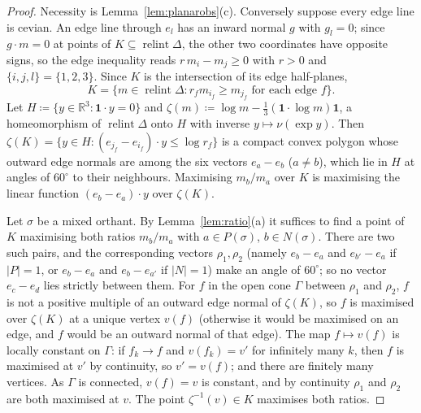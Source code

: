 \documentclass[11pt]{article}
\newcommand{\R}{\mathbb{R}}
\newcommand{\one}{\mathbf{1}}
\DeclareMathOperator{\relint}{relint}
\theoremstyle{plain}
\theoremstyle{definition}
\theoremstyle{remark}
\begin{document}
\begin{proof}
Necessity is Lemma~\ref{lem:planarobs}(c). Conversely suppose every edge line is cevian.
An edge line through $e_l$ has an inward normal $g$ with $g_l=0$; since $g\cdot m=0$ at
points of $K\subseteq\relint\Delta$, the other two coordinates have opposite signs, so the
edge inequality reads $r\,m_i-m_j\ge0$ with $r>0$ and $\{i,j,l\}=\{1,2,3\}$. Since $K$ is
the intersection of its edge half-planes,
\[
  K=\{m\in\relint\Delta:r_fm_{i_f}\ge m_{j_f}\text{ for each edge }f\}.
\]
Let $H\coloneqq\{y\in\R^3:\one\cdot y=0\}$ and $\zeta(m)\coloneqq\log m-\frac13(\one\cdot
\log m)\one$, a homeomorphism of $\relint\Delta$ onto $H$ with inverse $y\mapsto\nu(\exp
y)$. Then $\zeta(K)=\{y\in H:(e_{j_f}-e_{i_f})\cdot y\le\log r_f\}$ is a compact convex
polygon whose outward edge normals are among the six vectors $e_a-e_b$ ($a\ne b$), which
lie in $H$ at angles of $60^\circ$ to their neighbours. Maximising $m_b/m_a$ over $K$ is
maximising the linear function $(e_b-e_a)\cdot y$ over $\zeta(K)$.

Let $\sigma$ be a mixed orthant. By Lemma~\ref{lem:ratio}(a) it suffices to find a point of
$K$ maximising both ratios $m_b/m_a$ with $a\in P(\sigma)$, $b\in N(\sigma)$. There are two
such pairs, and the corresponding vectors $\rho_1,\rho_2$ (namely $e_b-e_a$ and
$e_{b'}-e_a$ if $|P|=1$, or $e_b-e_a$ and $e_b-e_{a'}$ if $|N|=1$) make an angle of
$60^\circ$; so no vector $e_c-e_d$ lies strictly between them. For $f$ in the open cone
$\Gamma$ between $\rho_1$ and $\rho_2$, $f$ is not a positive multiple of an outward edge
normal of $\zeta(K)$, so $f$ is maximised over $\zeta(K)$ at a unique vertex $v(f)$
(otherwise it would be maximised on an edge, and $f$ would be an outward normal of that
edge). The map $f\mapsto v(f)$ is locally constant on $\Gamma$: if $f_k\to f$ and
$v(f_k)=v'$ for infinitely many $k$, then $f$ is maximised at $v'$ by continuity, so
$v'=v(f)$; and there are finitely many vertices. As $\Gamma$ is connected, $v(f)=v$ is
constant, and by continuity $\rho_1$ and $\rho_2$ are both maximised at $v$. The point
$\zeta^{-1}(v)\in K$ maximises both ratios.
\end{proof}
\end{document}
